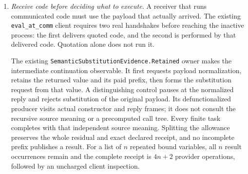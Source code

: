 \documentclass[11pt]{article}
\theoremstyle{definition}
\theoremstyle{remark}
\begin{document}
\begin{enumerate}
A wide closed receiver body makes storage preservation observable across
the whole path. Literal substitution in an already normalized,
variable-free body can retain that body rather than rebuilding each
occurrence. This does not suppress a deferred producer: its effects and
every result occurrence still belong to the communication. Compaction and
export reuse the graph-copy session, keeping the source generation live
until copying completes. A noncanonical process is normalized privately
before export; a canonical process keeps its copied graph. Reopening an
arena preserves its allocation profile rather than silently enabling
interning. These rules distinguish one stored value used many times from
deduplication of its observable occurrences.

Payload rendering, allocation, variable-bearing substitution and retirement
retain their separate service duties, including control destruction and
generation reclamation after a completed copy. Synchronous selection profiles
retain their declared atomic preparation and transfer services. An interning
arena uses the synchronous constructor rather than incremental draft assembly;
both providers retain the same required process observation.
Neither these structural controls nor the summary laws establish a bound
on those services or refine compiled C.

\item \emph{Receive code before deciding what to execute.}
A receiver that runs communicated code must use the payload that actually
arrived. The existing \nolinkurl{eval_at_comm} client requires two real
handshakes before reaching the inactive process: the first delivers quoted
code, and the second is performed by that delivered code. Quotation alone
does not run it.

The existing \nolinkurl{SemanticSubstitutionEvidence.Retained} owner makes
the intermediate continuation observable. It first requests payload
normalization, retains the returned value and its paid prefix, then forms
the substitution request from that value. A distinguishing control pauses
at the normalized reply and rejects substitution of the original payload.
Its defunctionalized producer visits actual constructor and reply frames;
it does not consult the recursive source meaning or a precomputed call tree.
Every finite task completes with that independent source meaning. Splitting
the allowance preserves the whole residual and exact declared receipt, and
no incomplete prefix publishes a result. For a list of $n$ repeated bound
variables, all $n$ result occurrences remain and the complete receipt is
$4n+2$ provider operations, followed by an uncharged client inspection.


\end{enumerate}
\end{document}

